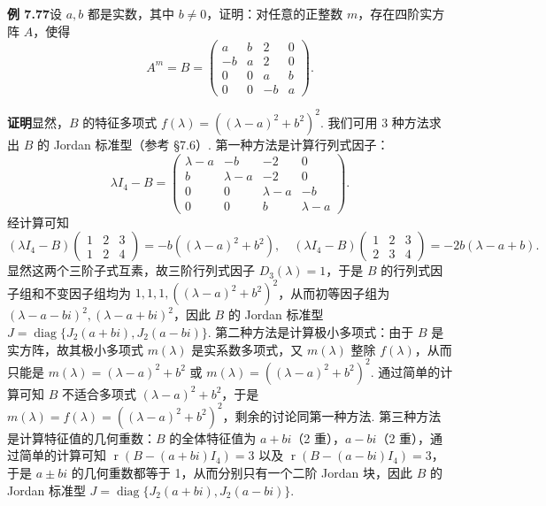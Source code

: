 \documentclass[UTF8,12pt,a4paper,fontset=fandol]{ctexart}
\begin{document}
\noindent\textbf{例 7.77}\quad 设 $a,b$ 都是实数，其中 $b\ne0$，证明：对任意的正整数 $m$，存在四阶实方阵 $A$，使得
\[
A^m=B=\left(\begin{array}{rrrr}
a&b&2&0\\
-b&a&2&0\\
0&0&a&b\\
0&0&-b&a
\end{array}\right).
\]

\noindent\textbf{证明}\quad 显然，$B$ 的特征多项式 $f(\lambda)=((\lambda-a)^2+b^2)^2$. 我们可用 3 种方法求出 $B$ 的 Jordan 标准型（参考 §7.6）. 第一种方法是计算行列式因子：
\[
\lambda I_4-B=\left(\begin{array}{rrrr}
\lambda-a&-b&-2&0\\
b&\lambda-a&-2&0\\
0&0&\lambda-a&-b\\
0&0&b&\lambda-a
\end{array}\right).
\]
经计算可知
\[
(\lambda I_4-B)\left(\begin{array}{ccc}1&2&3\\1&2&4\end{array}\right)=-b((\lambda-a)^2+b^2),\quad
(\lambda I_4-B)\left(\begin{array}{ccc}1&2&3\\2&3&4\end{array}\right)=-2b(\lambda-a+b).
\]
显然这两个三阶子式互素，故三阶行列式因子 $D_3(\lambda)=1$，于是 $B$ 的行列式因子组和不变因子组均为 $1,1,1,((\lambda-a)^2+b^2)^2$，从而初等因子组为 $(\lambda-a-bi)^2,(\lambda-a+bi)^2$，因此 $B$ 的 Jordan 标准型 $J=\operatorname{diag}\{J_2(a+bi),J_2(a-bi)\}$. 第二种方法是计算极小多项式：由于 $B$ 是实方阵，故其极小多项式 $m(\lambda)$ 是实系数多项式，又 $m(\lambda)$ 整除 $f(\lambda)$，从而只能是 $m(\lambda)=(\lambda-a)^2+b^2$ 或 $m(\lambda)=((\lambda-a)^2+b^2)^2$. 通过简单的计算可知 $B$ 不适合多项式 $(\lambda-a)^2+b^2$，于是 $m(\lambda)=f(\lambda)=((\lambda-a)^2+b^2)^2$，剩余的讨论同第一种方法. 第三种方法是计算特征值的几何重数：$B$ 的全体特征值为 $a+bi$（2 重），$a-bi$（2 重），通过简单的计算可知 $\operatorname{r}(B-(a+bi)I_4)=3$ 以及 $\operatorname{r}(B-(a-bi)I_4)=3$，于是 $a\pm bi$ 的几何重数都等于 1，从而分别只有一个二阶 Jordan 块，因此 $B$ 的 Jordan 标准型 $J=\operatorname{diag}\{J_2(a+bi),J_2(a-bi)\}$.
\end{document}
